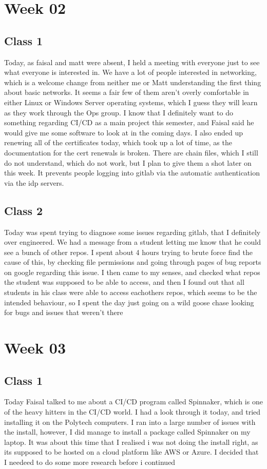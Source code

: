 \documentclass{article}
\begin{document}
\section{Week 02}
\subsection{Class 1}
Today, as faisal and matt were absent, I held a meeting with everyone just to see what everyone is interested in. We have
a lot of people interested in networking, which is a welcome change from neither me or Matt understanding the first thing about
basic networks. It seems a fair few of them aren't overly comfortable in either Linux or Windows Server operating systems, which
I guess they will learn as they work through the Ops group. I know that I definitely want to do something regarding CI/CD as a main
project this semester, and Faisal said he would give me some software to look at in the coming days. I also ended up renewing all of
the certificates today, which took up a lot of time, as the documentation for the cert renewals is broken. There are chain files, which
I still do not understand, which do not work, but I plan to give them a shot later on this week.  It prevents people logging into gitlab
via the automatic authentication via the idp servers. 
\subsection{Class 2}
Today was spent trying to diagnose some issues regarding gitlab, that I definitely over engineered. We had a message from a student
letting me know that he could see a bunch of other repos. I spent about 4 hours trying to brute force find the cause of this, by checking
file permissions and going through pages of bug reports on google regarding this issue. I then came to my senses, and checked what repos
the student was supposed to be able to access, and then I found out that all students in his class were able to access eachothers repos, 
which seems to be the intended behaviour, so I spent the day just going on a wild goose chase looking for bugs and issues that weren't there

\section{Week 03}
\subsection{Class 1}
Today Faisal talked to me about a CI/CD program called Spinnaker, which is one of the heavy hitters in the CI/CD world. I had a look
through it today, and tried installing it on the Polytech computers. I ran into a large number of issues with the install, however, I did
manage to install a package called Spinnaker on my laptop. It was about this time that I realised i was not doing the install right, as its
supposed to be hosted on a cloud platform like AWS or Azure. I decided that I needeed to do some more research before i continued
\end{document}
